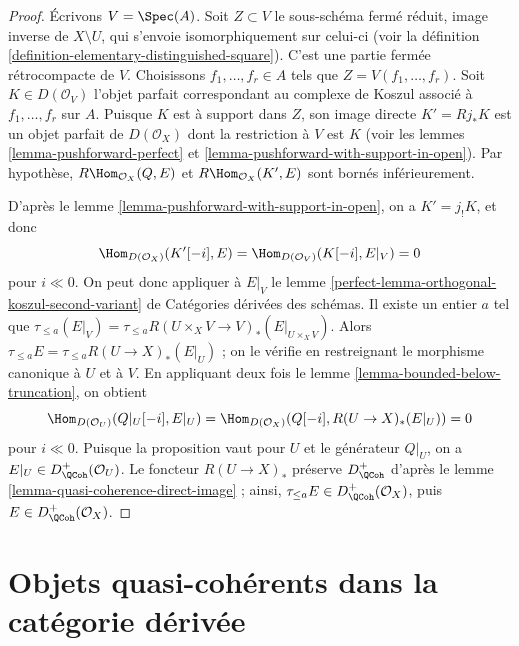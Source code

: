 \begin{proof}
\medskip\noindent
\'Ecrivons $V=\Spec(A)$. Soit $Z\subset V$ le sous-sch\'ema ferm\'e r\'eduit,
image inverse de $X\setminus U$, qui s'envoie isomorphiquement sur celui-ci
(voir la d\'efinition \ref{definition-elementary-distinguished-square}).
C'est une partie ferm\'ee r\'etrocompacte de $V$. Choisissons
$f_1,\ldots,f_r\in A$ tels que $Z=V(f_1,\ldots,f_r)$. Soit
$K\in D(\mathcal{O}_V)$ l'objet parfait correspondant au complexe de Koszul
associ\'e \`a $f_1,\ldots,f_r$ sur $A$. Puisque $K$ est \`a support dans $Z$,
son image directe $K'=Rj_*K$ est un objet parfait de $D(\mathcal{O}_X)$ dont
la restriction \`a $V$ est $K$ (voir les lemmes
\ref{lemma-pushforward-perfect} et
\ref{lemma-pushforward-with-support-in-open}). Par hypoth\`ese,
$R\Hom_{\mathcal{O}_X}(Q,E)$ et $R\Hom_{\mathcal{O}_X}(K',E)$ sont born\'es
inf\'erieurement.

\medskip\noindent
D'apr\`es le lemme \ref{lemma-pushforward-with-support-in-open}, on a
$K'=j_!K$, et donc
$$
\Hom_{D(\mathcal{O}_X)}(K'[-i], E) = \Hom_{D(\mathcal{O}_V)}(K[-i], E|_V) = 0
$$
pour $i\ll0$. On peut donc appliquer \`a $E|_V$ le lemme
\ref{perfect-lemma-orthogonal-koszul-second-variant} de Cat\'egories d\'eriv\'ees
des sch\'emas. Il existe un entier $a$ tel que
$\tau_{\leq a}(E|_V)=
\tau_{\leq a}R(U\times_XV\to V)_*(E|_{U\times_XV})$.
Alors $\tau_{\leq a}E=\tau_{\leq a}R(U\to X)_*(E|_U)$ ; on le v\'erifie en
restreignant le morphisme canonique \`a $U$ et \`a $V$. En appliquant deux fois
le lemme \ref{lemma-bounded-below-truncation}, on obtient
$$
\Hom_{D(\mathcal{O}_U)}(Q|_U [-i], E|_U) =
\Hom_{D(\mathcal{O}_X)}(Q[-i], R (U \to X)_* (E|_U)) = 0
$$
pour $i\ll0$. Puisque la proposition vaut pour $U$ et le g\'en\'erateur
$Q|_U$, on a $E|_U\in D^+_\QCoh(\mathcal{O}_U)$. Le foncteur
$R(U\to X)_*$ pr\'eserve $D^+_\QCoh$ d'apr\`es le lemme
\ref{lemma-quasi-coherence-direct-image} ; ainsi,
$\tau_{\leq a}E\in D^+_\QCoh(\mathcal{O}_X)$, puis
$E\in D^+_\QCoh(\mathcal{O}_X)$.
\end{proof}










\section{Objets quasi-coh\'erents dans la cat\'egorie d\'eriv\'ee}
\label{section-QC}

